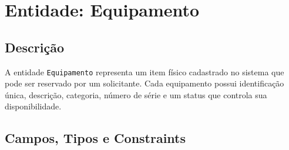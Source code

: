 \documentclass[12pt,a4paper]{article}
\begin{document}
\section{Entidade: Equipamento}

\subsection{Descrição}

A entidade \texttt{Equipamento} representa um item físico cadastrado no sistema que pode
ser reservado por um solicitante. Cada equipamento possui identificação única, descrição,
categoria, número de série e um status que controla sua disponibilidade.

\subsection{Campos, Tipos e Constraints}
\end{document}
